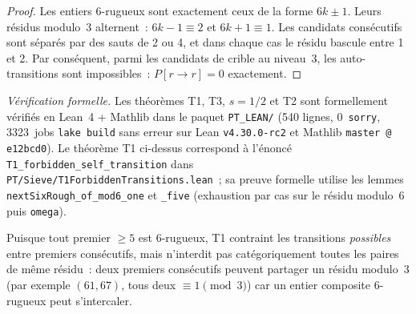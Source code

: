 \documentclass[12pt,a4paper]{article}
\begin{document}
\begin{proof}
Les entiers $6$-rugueux sont exactement ceux de la forme $6k \pm 1$.
Leurs résidus modulo~3 alternent~: $6k - 1 \equiv 2$ et
$6k + 1 \equiv 1$. Les candidats consécutifs sont séparés par des
sauts de 2 ou 4, et dans chaque cas le résidu bascule entre 1 et 2.
Par conséquent, parmi les candidats de crible au niveau~3, les
auto-transitions sont impossibles~: $P[r \to r] = 0$ exactement.
\end{proof}

\medskip
\noindent\emph{Vérification formelle.}
Les théorèmes T1, T3, $s=1/2$ et T2 sont formellement vérifiés en
Lean~4 + Mathlib dans le paquet \texttt{PT\_LEAN/} (540 lignes, 0~\texttt{sorry},
3323~jobs \texttt{lake build} sans erreur sur Lean \texttt{v4.30.0-rc2} et
Mathlib \texttt{master @ e12bcd0}). Le théorème T1 ci-dessus correspond à
l'énoncé \texttt{T1\_forbidden\_self\_transition} dans
\texttt{PT/Sieve/T1ForbiddenTransitions.lean}~; sa preuve formelle utilise
les lemmes \texttt{nextSixRough\_of\_mod6\_one} et \texttt{\_five} (exhaustion
par cas sur le résidu modulo~6 puis \texttt{omega}).

\begin{corollaire}
\label{cor:T1_primes}
Puisque tout premier $\geq 5$ est $6$-rugueux, T1 contraint les
transitions \emph{possibles} entre premiers consécutifs, mais
n'interdit pas catégoriquement toutes les paires de même résidu~: deux
premiers consécutifs peuvent partager un résidu modulo~$3$ (par
exemple $(61, 67)$, tous deux $\equiv 1 \pmod{3}$) car un entier
composite $6$-rugueux peut s'intercaler.
\end{corollaire}
\end{document}
